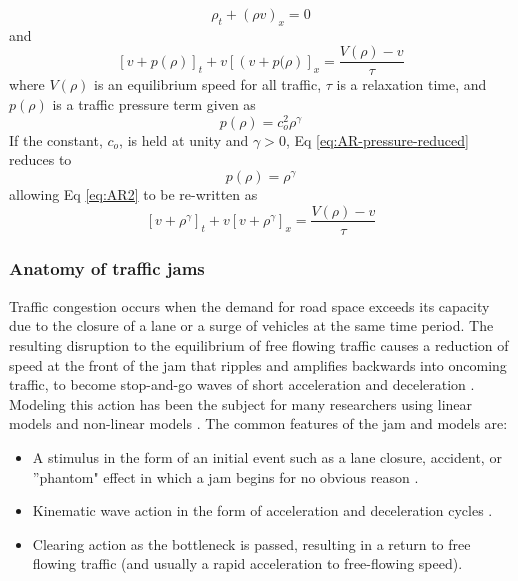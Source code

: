 \documentclass[preprint,12pt,a4paper,authoryear]{elsarticle}
\begin{document}
\begin{linenumbers}
\begin{equation}
\label{eq:AR1}
\rho_{t}+\left (\rho v  \right )_{x}=0
\end{equation}	
%
\noindent
and 
%
\begin{equation}
\label{eq:AR2}
\left [ v+p(\rho) \right ]_{t}+v\left [ \left ( v+p(\rho \right ) \right ]_{x}=\frac{V(\rho)-v}{\tau}
\end{equation}	
%
\noindent
where $V(\rho)$ is an equilibrium speed for all traffic, $\tau$ is a relaxation time, and $p(\rho)$ is a traffic pressure term given as
%
\begin{equation}
\label{eq:AR-pressure}
p(\rho)=c_{o}^{2}\rho^{\gamma}
\end{equation}	
%
If the constant, $c_{o}$, is held at unity and $\gamma >0$, Eq \ref{eq:AR-pressure-reduced} reduces to 
%
\begin{equation}
\label{eq:AR-pressure-reduced}
p(\rho)=\rho^{\gamma}
\end{equation}	
%
\noindent
allowing Eq \ref{eq:AR2} to be re-written as
%
\begin{equation}
\label{eq:AR2-reduced}
\left [ v+\rho^{\gamma} \right ]_{t}+v\left [v+\rho^{\gamma}\right ]_{x}=\frac{V(\rho)-v}{\tau}
\end{equation}	
%
\subsubsection{Anatomy of traffic jams}
Traffic congestion occurs when the demand for road space exceeds its capacity due to the closure of a lane or a surge of vehicles at the same time period. The resulting disruption to the equilibrium of free flowing traffic causes a reduction of speed at the front of the jam that ripples and amplifies backwards into oncoming traffic, to become stop-and-go waves of short acceleration and deceleration \citep{Orosz2010}. Modeling this action has been the subject for many researchers using linear models \citep{Lighthill1955,Treiber2000} and non-linear models \citep{Li2005}. The common features of the jam and models are:

\begin{itemize}
\item{A stimulus in the form of an initial event such as a lane closure, accident, or ''phantom" effect in which a jam begins for no obvious reason \citep{Flynn2008}.}
\item{Kinematic wave action in the form of acceleration and deceleration cycles \citep{Lighthill1955}.}
\item{Clearing action as the bottleneck is passed, resulting in a return to free flowing traffic (and usually a rapid acceleration to free-flowing speed).}
\end{itemize}


\end{linenumbers}
\end{document}
